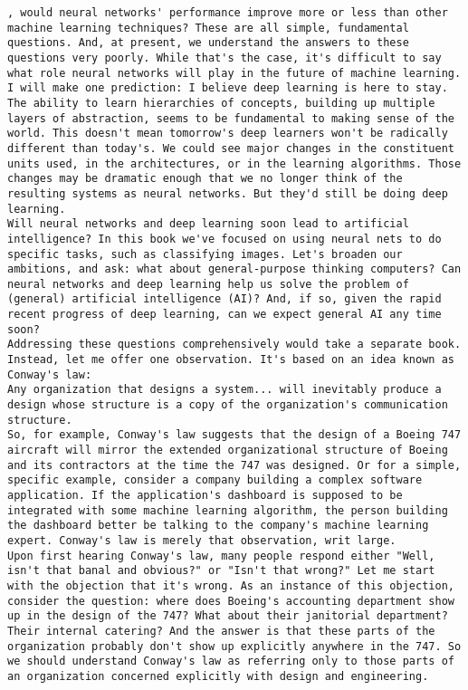 \begin{lstlisting}
, would neural networks' performance improve more or less than other machine learning techniques? These are all simple, fundamental questions. And, at present, we understand the answers to these questions very poorly. While that's the case, it's difficult to say what role neural networks will play in the future of machine learning.
I will make one prediction: I believe deep learning is here to stay. The ability to learn hierarchies of concepts, building up multiple layers of abstraction, seems to be fundamental to making sense of the world. This doesn't mean tomorrow's deep learners won't be radically different than today's. We could see major changes in the constituent units used, in the architectures, or in the learning algorithms. Those changes may be dramatic enough that we no longer think of the resulting systems as neural networks. But they'd still be doing deep learning.
Will neural networks and deep learning soon lead to artificial intelligence? In this book we've focused on using neural nets to do specific tasks, such as classifying images. Let's broaden our ambitions, and ask: what about general-purpose thinking computers? Can neural networks and deep learning help us solve the problem of (general) artificial intelligence (AI)? And, if so, given the rapid recent progress of deep learning, can we expect general AI any time soon?
Addressing these questions comprehensively would take a separate book. Instead, let me offer one observation. It's based on an idea known as Conway's law: 
Any organization that designs a system... will inevitably produce a design whose structure is a copy of the organization's communication structure. 
So, for example, Conway's law suggests that the design of a Boeing 747 aircraft will mirror the extended organizational structure of Boeing and its contractors at the time the 747 was designed. Or for a simple, specific example, consider a company building a complex software application. If the application's dashboard is supposed to be integrated with some machine learning algorithm, the person building the dashboard better be talking to the company's machine learning expert. Conway's law is merely that observation, writ large.
Upon first hearing Conway's law, many people respond either "Well, isn't that banal and obvious?" or "Isn't that wrong?" Let me start with the objection that it's wrong. As an instance of this objection, consider the question: where does Boeing's accounting department show up in the design of the 747? What about their janitorial department? Their internal catering? And the answer is that these parts of the organization probably don't show up explicitly anywhere in the 747. So we should understand Conway's law as referring only to those parts of an organization concerned explicitly with design and engineering.

\end{lstlisting}
